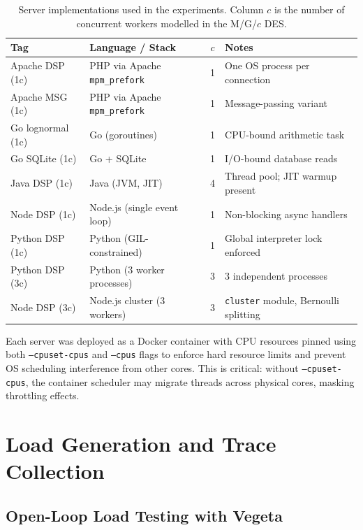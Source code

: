 \begin{table}[h]
\centering
\caption{Server implementations used in the experiments. Column $c$ is the number of concurrent workers modelled in the M/G/$c$ DES.}
\label{tab:server-catalogue}
\begin{tabular}{l l c l}
\toprule
\textbf{Tag} & \textbf{Language / Stack} & \textbf{$c$} & \textbf{Notes} \\
\midrule
Apache DSP (1c)   & PHP via Apache \texttt{mpm\_prefork} & 1 & One OS process per connection \\
Apache MSG (1c)   & PHP via Apache \texttt{mpm\_prefork} & 1 & Message-passing variant \\
Go lognormal (1c) & Go (goroutines)                     & 1 & CPU-bound arithmetic task \\
Go SQLite (1c)    & Go + SQLite                         & 1 & I/O-bound database reads \\
Java DSP (1c)     & Java (JVM, JIT)                     & 4 & Thread pool; JIT warmup present \\
Node DSP (1c)     & Node.js (single event loop)         & 1 & Non-blocking async handlers \\
Python DSP (1c)   & Python (GIL-constrained)            & 1 & Global interpreter lock enforced \\
Python DSP (3c)   & Python (3 worker processes)         & 3 & 3 independent processes \\
Node DSP (3c)     & Node.js cluster (3 workers)         & 3 & \texttt{cluster} module, Bernoulli splitting \\
\bottomrule
\end{tabular}
\end{table}

Each server was deployed as a Docker container with CPU resources pinned using both \texttt{--cpuset-cpus} and \texttt{--cpus} flags to enforce hard resource limits and prevent OS scheduling interference from other cores. This is critical: without \texttt{--cpuset-cpus}, the container scheduler may migrate threads across physical cores, masking throttling effects.

\section{Load Generation and Trace Collection}
\label{sec:load-gen}

\subsection{Open-Loop Load Testing with Vegeta}

